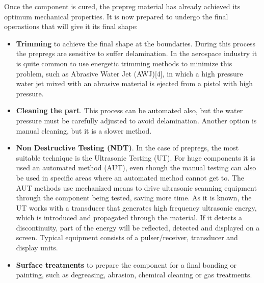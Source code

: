Once the component is cured, the prepreg material has already achieved its optimum mechanical properties. It is now prepared to undergo the final operastions that will give it its final shape:

\begin{itemize}
\item \textbf{Trimming} to achieve the final shape at the boundaries. During this process the prepregs are sensitive to suffer delamination. In the aerospace industry it is quite common to use energetic trimming methods to minimize this problem, such as Abrasive Water Jet (AWJ)[4], in which a high pressure water jet mixed with an abrasive material is ejected from a pistol with high pressure.
\item \textbf{Cleaning the part}. This process can be automated also, but the water pressure must be carefully adjusted to avoid delamination. Another option is manual cleaning, but it is a slower method.
\item \textbf{Non Destructive Testing (NDT)}. In the case of prepregs, the most suitable technique is the Ultrasonic Testing (UT). For huge components it is used an automated method (AUT), even though the manual testing can also be used in specific areas where an automated method cannot get to. The AUT methods use mechanized means to drive ultrasonic scanning equipment through the component being tested, saving more time. As it is known, the UT works with a transducer that generates high frequency ultrasonic energy, which is introduced and propagated through the material. If it detects a discontinuity, part of the energy will be reflected, detected and displayed on a screen. Typical equipment consists of a pulser/receiver, transducer and display units.
\item \textbf{Surface treatments} to prepare the component for a final bonding or painting, such as degreasing, abrasion, chemical cleaning or gas treatments.
\end{itemize}




